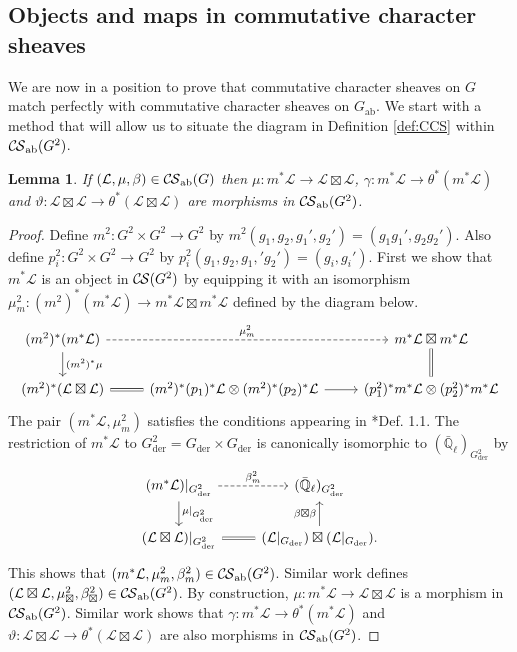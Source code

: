 \documentclass[10pt]{amsart}
\theoremstyle{plain}
\newtheorem{lemma}[theorem]{Lemma}
\theoremstyle{definition}
\newcommand{\EE}{\mathbb{\bar Q}_\ell}
\newcommand{\der}{_{\operatorname{der}}}
\newcommand{\ab}{_{\operatorname{ab}}}
\newcommand{\cs}[1]{{\mathcal{#1}}}
\newcommand{\CS}{{\mathcal{C\hskip-0.8pt S}}}
\begin{document}
\subsection{Objects and maps in commutative character sheaves} \label{ssec:obmor}

We are now in a position to prove that commutative character sheaves on $G$ match perfectly with commutative character sheaves on $G\ab$.
We start with a method that will allow us to situate the diagram in Definition \ref{def:CCS} within $\CS\ab(G^2)$.

\begin{lemma}\label{lemma:morinCSab}
If $(\cs{L},\mu,\beta)\in \CS\ab(G)$ then $\mu  : m^*\cs{L} \to \cs{L}\boxtimes\cs{L}$, $\gamma : m^*\cs{L} \to  \theta^*(m^*\cs{L})$ and $\vartheta: \cs{L}\boxtimes\cs{L} \to \theta^*(\cs{L}\boxtimes \cs{L})$ are morphisms in $\CS\ab(G^2)$.
\end{lemma}
\begin{proof}
Define $m^2 : G^2\times G^2 \to G^2$ by $m^2(g_1,g_2,g_1',g_2') = (g_1g_1',g_2g_2')$. Also define $p^2_i : G^2\times G^2 \to G^2$ by $p^2_i(g_1,g_2,g_1,'g_2') = (g_i,g_i')$.
First we show that $m^*\cs{L}$ is an object in $\CS(G^2)$ by equipping it with an isomorphism $\mu_m^2: (m^2)^* (m^*\cs{L}) \to m^*\cs{L} \boxtimes m^*\cs{L}$ defined by the diagram below.
\[
\begin{tikzcd}
(m^2)^* (m^*\cs{L}) \arrow{d}{(m^2)^*\mu} \arrow[dashed]{rr}{\mu_m^2} && m^*\cs{L} \boxtimes m^*\cs{L}\\
 (m^2)^*(\cs{L}\boxtimes\cs{L}) \arrow[equal]{r} & (m^2)^*(p_1)^*\cs{L} \otimes (m^2)^*(p_2)^*\cs{L} \arrow{r} & (p^2_1)^*m^*\cs{L} \otimes (p^2_2)^*m^*\cs{L} \arrow[equal]{u}
\end{tikzcd}
\] 
The pair $(m^*\cs{L},\mu_m^2)$ satisfies the conditions appearing in \cite{cunningham-roe:13a}*{Def. 1.1}.
The restriction of $m^*\cs{L}$ to $G^2\der= G\der\times G\der$ is canonically isomorphic to $(\EE)_{G^2\der}$ by
\[
\begin{tikzcd}
(m^*\cs{L})\vert_{G^2\der} \arrow{d}{\mu\vert_{G^2\der}} \arrow[dashed]{r}{\beta^2_m} & (\EE)_{G^2\der}\\
(\cs{L}\boxtimes\cs{L})\vert_{G^2\der} \arrow[equal]{r} & (\cs{L}\vert_{G\der})\boxtimes(\cs{L}\vert_{G\der}) \arrow{u}{\beta\boxtimes\beta}.
\end{tikzcd}
\]
This shows that $(m^*\cs{L},\mu_m^2,\beta_m^2) \in \CS\ab(G^2)$. 
Similar work defines $(\cs{L}\boxtimes\cs{L},\mu_\boxtimes^2,\beta_\boxtimes^2) \in \CS\ab(G^2)$.
By construction, $\mu: m^*\cs{L} \to \cs{L}\boxtimes\cs{L}$ is a morphism in $\CS\ab(G^2)$.
Similar work shows that $\gamma : m^*\cs{L} \to  \theta^*(m^*\cs{L})$ and $\vartheta: \cs{L}\boxtimes\cs{L} \to \theta^*(\cs{L}\boxtimes \cs{L})$ are also morphisms in $\CS\ab(G^2)$.
\end{proof}
\end{document}

